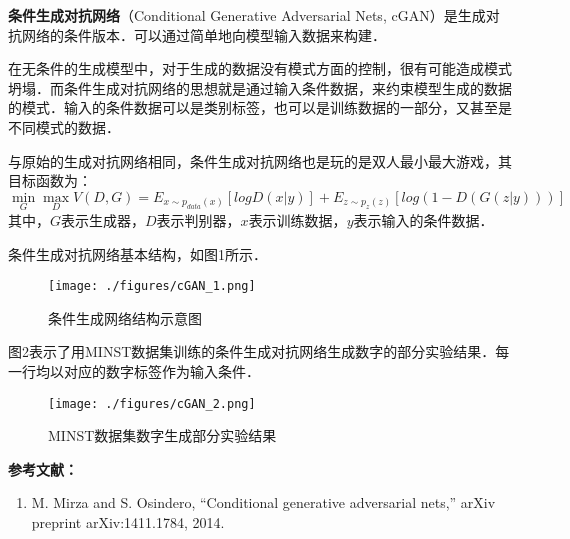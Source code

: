 
\textbf{条件生成对抗网络}（Conditional Generative Adversarial Nets, cGAN）是生成对抗网络的条件版本．可以通过简单地向模型输入数据来构建．

在无条件的生成模型中，对于生成的数据没有模式方面的控制，很有可能造成模式坍塌．而条件生成对抗网络的思想就是通过输入条件数据，来约束模型生成的数据的模式．输入的条件数据可以是类别标签，也可以是训练数据的一部分，又甚至是不同模式的数据．

与原始的生成对抗网络相同，条件生成对抗网络也是玩的是双人最小最大游戏，其目标函数为：
\begin{equation}
\mathop{\min}\limits_G \mathop {\max }\limits_D V(D,G)=E_{x\sim p_{data}(x)}[logD(x|y)]+E_{z\sim p_z(z)}[log(1-D(G(z|y)))]
\end{equation}
其中，$G$表示生成器，$D$表示判别器，$x$表示训练数据，$y$表示输入的条件数据．

条件生成对抗网络基本结构，如图1所示．
\begin{figure}[ht]
\centering
\texttt{[image: ./figures/cGAN\_1.png]}
\caption{条件生成网络结构示意图} \label{cGAN_fig1}
\end{figure}

图2表示了用MINST数据集训练的条件生成对抗网络生成数字的部分实验结果．每一行均以对应的数字标签作为输入条件．
\begin{figure}[ht]
\centering
\texttt{[image: ./figures/cGAN\_2.png]}
\caption{MINST数据集数字生成部分实验结果} \label{cGAN_fig2}
\end{figure}



\textbf{参考文献：}
\begin{enumerate}
\item M. Mirza and S. Osindero, “Conditional generative adversarial nets,” arXiv preprint arXiv:1411.1784, 2014.
\end{enumerate}